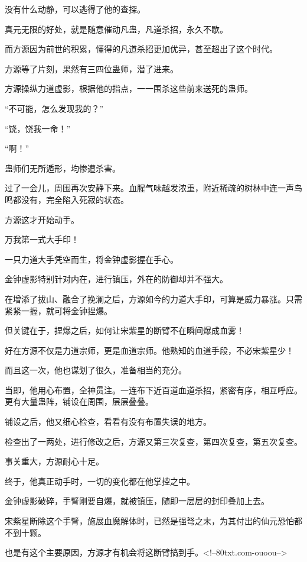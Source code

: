 \begin{this_body}
没有什么动静，可以逃得了他的查探。

真元无限的好处，就是随意催动凡蛊，凡道杀招，永久不歇。

而方源因为前世的积累，懂得的凡道杀招更加优异，甚至超出了这个时代。

方源等了片刻，果然有三四位蛊师，潜了进来。

方源操纵力道虚影，根据他的指点，一一围杀这些前来送死的蛊师。

“不可能，怎么发现我的？”

“饶，饶我一命！”

“啊！”

蛊师们无所遁形，均惨遭杀害。

过了一会儿，周围再次安静下来。血腥气味越发浓重，附近稀疏的树林中连一声鸟鸣都没有，完全陷入死寂的状态。

方源这才开始动手。

万我第一式大手印！

一只力道大手凭空而生，将金钟虚影握在手心。

金钟虚影特别针对内在，进行镇压，外在的防御却并不强大。

在增添了拔山、融合了挽澜之后，方源如今的力道大手印，可算是威力暴涨。只需紧紧一握，就可将金钟捏爆。

但关键在于，捏爆之后，如何让宋紫星的断臂不在瞬间爆成血雾！

好在方源不仅是力道宗师，更是血道宗师。他熟知的血道手段，不必宋紫星少！

而且这一次，他也谋划了很久，准备相当的充分。

当即，他用心布置，全神贯注。一连布下近百道血道杀招，紧密有序，相互呼应。更有大量蛊阵，铺设在周围，层层叠叠。

铺设之后，他又细心检查，看看有没有布置失误的地方。

检查出了一两处，进行修改之后，方源又第三次复查，第四次复查，第五次复查。

事关重大，方源耐心十足。

终于，他真正动手时，一切的变化都在他掌控之中。

金钟虚影破碎，手臂刚要自爆，就被镇压，随即一层层的封印叠加上去。

宋紫星断除这个手臂，施展血魔解体时，已然是强弩之末，为其付出的仙元恐怕都不到十颗。

也是有这个主要原因，方源才有机会将这断臂搞到手。<!--80txt.com-ouoou-->

\end{this_body}

